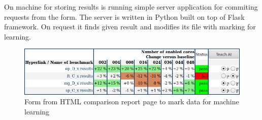 On machine for storing results is running simple server application for
commiting requests from the form. The server is written in Python built on top
of Flask framework. On request it finds given result and modifies its file with
marking for learning.

\begin{figure}
  \centering
  \includegraphics[width=12cm]{obrazky-figures/teaching_table}
  \caption{Form from HTML comparison report page to mark data for machine learning}
\end{figure}




